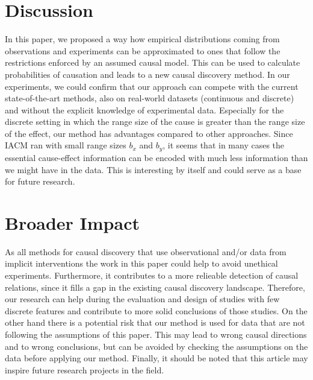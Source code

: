 \documentclass[letterpaper]{article}
\begin{document}
\section{Discussion} \label{sec.discussion}

In this paper, we proposed a way how empirical distributions coming from observations and experiments can be approximated to ones that follow the restrictions enforced by an assumed causal model. This can be used to calculate probabilities of causation and leads to a new causal discovery method. In our experiments, we could confirm that our approach can compete with the current state-of-the-art methods, also on real-world datasets (continuous and discrete) and without the explicit knowledge of experimental data. Especially for the discrete setting in which the range size of the cause is greater than the range size of the effect, our method has advantages compared to other approaches. Since IACM ran with small range sizes $b_x$ and $b_y$, it seems that in many cases the essential cause-effect information can be encoded with much less information than we might have in the data. This is interesting by itself and could serve as a base for future research.

\section*{Broader Impact}

As all methods for causal discovery that use observational and/or data from implicit interventions the work in this paper could help to avoid unethical experiments. Furthermore, it contributes to a more relieable detection of causal relations, since it fills a gap in the existing causal discovery landscape. Therefore, our research can help during the evaluation and design of studies with few discrete features and contribute to more solid conclusions of those studies. On the other hand there is a potential risk that our method is used for data that are not following the assumptions of this paper. This may lead to wrong causal directions and to wrong conclusions, but can be avoided by checking the assumptions on the data before applying our method. Finally, it should be noted that this article may inspire future research projects in the field.



\end{document}
